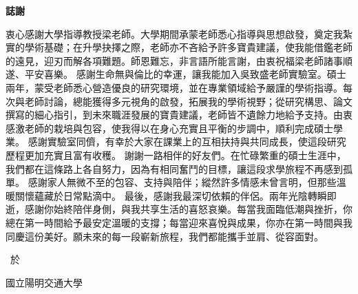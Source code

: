 \thispagestyle{empty}

\begin{center}
\Large
\textbf{誌\hspace{1cm}謝}
\end{center}

\vspace{1cm}
\linespread{2}%
\selectfont
\hspace{0.25cm}

衷心感謝大學指導教授梁老師。大學期間承蒙老師悉心指導與思想啟發，奠定我紮實的學術基礎；在升學抉擇之際，老師亦不吝給予許多寶貴建議，使我能借鑑老師的遠見，迎刃而解各項難題。師恩難忘，非言語所能言謝，由衷祝福梁老師諸事順遂、平安喜樂。
感謝生命無與倫比的幸運，讓我能加入吳致盛老師實驗室。碩士兩年，蒙受老師悉心營造優良的研究環境，並在專業領域給予嚴謹的學術指導。每次與老師討論，總能獲得多元視角的啟發，拓展我的學術視野；從研究構思、論文撰寫的細心指引，到未來職涯發展的寶貴建議，老師皆不遺餘力地給予支持。由衷感激老師的栽培與包容，使我得以在身心充實且平衡的步調中，順利完成碩士學業。
感謝實驗室同儕，有幸於大家在課業上的互相扶持與共同成長，使這段研究歷程更加充實且富有收穫。
謝謝一路相伴的好友們。在忙碌繁重的碩士生涯中，我們都在這條路上各自努力，因為有相同奮鬥的目標，讓這段求學旅程不再感到孤單。
感謝家人無微不至的包容、支持與陪伴；縱然許多情感未曾言明，但那些溫暖關懷蘊藏於日常點滴中。
最後，感謝我最深切依賴的伴侶。兩年光陰轉瞬即逝，感謝你始終陪伴身側，與我共享生活的喜怒哀樂。每當我面臨低潮與挫折，你總在第一時間給予最安定溫暖的支撐；每當迎來喜悅與成果，你亦在第一時間與我同慶這份美好。願未來的每一段嶄新旅程，我們都能攜手並肩、從容面對。
\vspace{2cm}
\begin{flushright}
\studentCnName \ 於

國立陽明交通大學\ \NameofDepartmentInstituteCN

\ThesisDateTW
\end{flushright}